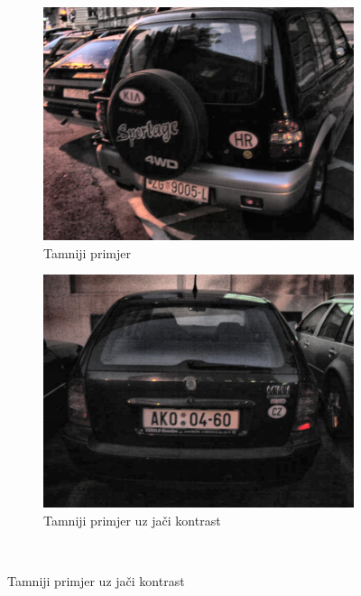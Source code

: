 \documentclass[times, utf8, diplomski]{fer}
\begin{document}
\begin{figure}[H]
     \centering
     \begin{subfigure}[b]{0.4\textwidth}
         \centering
         \includegraphics[width=\textwidth]{figures/ce_examples/1/gauss.jpg}
         \caption{Tamniji primjer}
         \label{fig:ce_gauss_tamniji}
     \end{subfigure}
     \hspace{1cm}
     \begin{subfigure}[b]{0.4\textwidth}
         \centering
         \includegraphics[width=\textwidth]{figures/ce_examples/2/gauss.jpg}
         \caption{Tamniji primjer uz jači kontrast}
     \end{subfigure}\\[0.5cm]

\end{figure}
\end{document}
